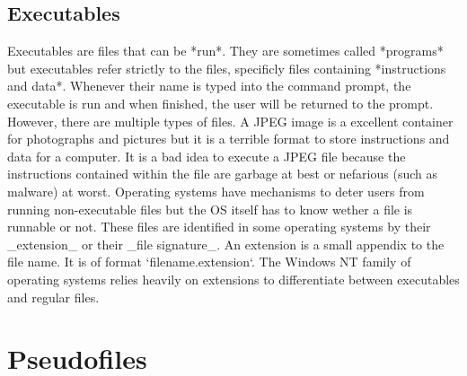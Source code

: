 \subsection{Executables}

Executables are files that can be *run*. They are sometimes called *programs* but executables refer
strictly to the files, specificly files containing *instructions and data*. Whenever their name is
typed into the command prompt, the executable is run and when finished, the user will be returned to
the prompt. However, there are multiple types of files. A JPEG image is a excellent container for
photographs and pictures but it is a terrible format to store instructions and data for a computer.
It is a bad idea to execute a JPEG file because the instructions contained within the file are garbage
at best or nefarious (such as malware) at worst. Operating systems have mechanisms to deter users from
running non-executable files but the OS itself has to know wether a file is runnable or not. These files
are identified in some operating systems by their _extension_ or their _file signature_. An extension is
a small appendix to the file name. It is of format `filename.extension`. The Windows NT family of operating
systems relies heavily on extensions to differentiate between executables and regular files. 

\section{Pseudofiles}

